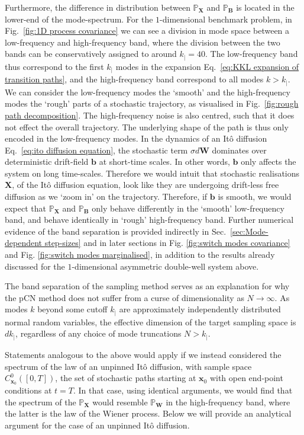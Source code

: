 Furthermore, the difference in distribution between $\mathbb{P}_\mathbf{X}$ and $\mathbb{P}_\mathbf{B}$ is located in the lower-end of the mode-spectrum. For the $1$-dimensional benchmark problem, in Fig.~\ref{fig:1D process covariance} we can see a division in mode space between a low-frequency and high-frequency band, where the division between the two bands can be conservatively assigned to around $k_| = 40$. The low-frequency band thus correspond to the first $k_|$ modes in the expansion Eq.~\ref{eq:KKL expansion of transition paths}, and the high-frequency band correspond to all modes $k > k_|$. We can consider the low-frequency modes the `smooth' and the high-frequency modes the `rough' parts of a stochastic trajectory, as visualised in Fig.~\ref{fig:rough path decomposition}. The high-frequency noise is also centred, such that it does not effect the overall trajectory. The underlying shape of the path is thus only encoded in the low-frequency modes. In the dynamics of an It\^{o} diffusion Eq.~\ref{eq:ito diffusion equation}, the stochastic term $\sigma d\mathbf{W}$ dominates over deterministic drift-field $\mathbf{b}$ at short-time scales. In other words, $\mathbf{b}$ only affects the system on long time-scales. Therefore we would intuit that stochastic realisations $\mathbf{X}$, of the It\^{o} diffusion equation, look like they are undergoing drift-less free diffusion as we `zoom in' on the trajectory. Therefore, if $\mathbf{b}$ is smooth, we would expect that $\mathbb{P}_\mathbf{X}$ and $\mathbb{P}_\mathbf{B}$ only behave differently in the `smooth' low-frequency band, and behave identically in `rough' high-frequency band. Further numerical evidence of the band separation is provided indirectly in Sec.~\ref{sec:Mode-dependent step-sizes} and in later sections in Fig. \ref{fig:switch modes covariance} and Fig. \ref{fig:switch modes marginalised}, in addition to the results already discussed for the $1$-dimensional asymmetric double-well system above.

The band separation of the sampling method serves as an explanation for why the pCN method does not suffer from a curse of dimensionality as $N \to \infty$. As modes $k$ beyond some cutoff $k_|$ are approximately independently distributed normal random variables, the effective dimension of the target sampling space is $d k_|$, regardless of any choice of mode truncations $N > k_|$.

Statements analogous to the above would apply if we instead considered the spectrum of the law of an unpinned It\^{o} diffusion, with sample space $C_{\mathbf{x}_0}^0([0,T])$, the set of stochastic paths starting at $\mathbf{x}_0$ with open end-point conditions at $t=T$. In that case, using identical arguments, we would find that the spectrum of the $\mathbb{P}_\mathbf{X}$ would resemble $\mathbb{P}_\mathbf{W}$ in the high-frequency band, where the latter is the law of the Wiener process. Below we will provide an analytical argument for the case of an unpinned It\^{o} diffusion.

